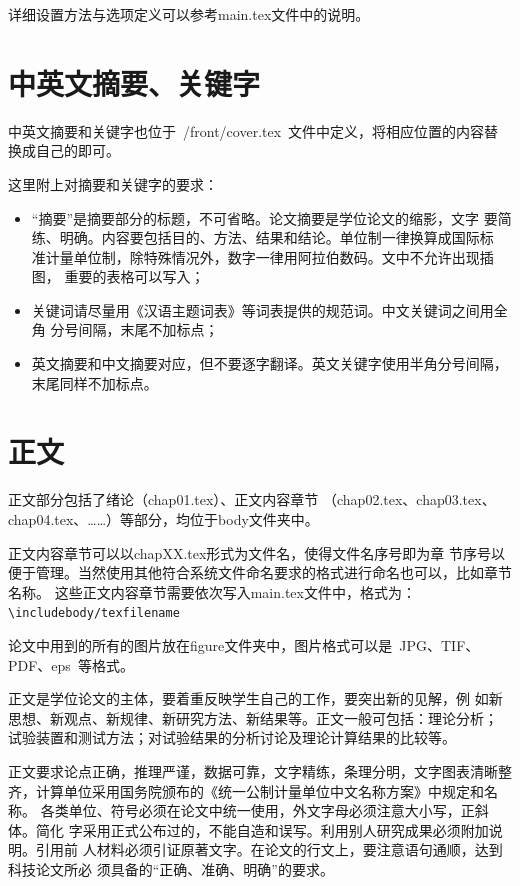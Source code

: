 详细设置方法与选项定义可以参考main.tex文件中的说明。

\section{中英文摘要、关键字}

中英文摘要和关键字也位于~{/front/cover.tex}~文件中定义，将相应位置的内容替换成自己的即可。

这里附上对摘要和关键字的要求：
\begin{itemize}
  \item “摘要”是摘要部分的标题，不可省略。论文摘要是学位论文的缩影，文字
        要简练、明确。内容要包括目的、方法、结果和结论。单位制一律换算成国际标
        准计量单位制，除特殊情况外，数字一律用阿拉伯数码。文中不允许出现插图，
        重要的表格可以写入；
  \item 关键词请尽量用《汉语主题词表》等词表提供的规范词。中文关键词之间用全角
        分号间隔，末尾不加标点；
  \item 英文摘要和中文摘要对应，但不要逐字翻译。英文关键字使用半角分号间隔，
        末尾同样不加标点。
\end{itemize}

\section{正文}

正文部分包括了绪论（chap01.tex）、正文内容章节
（chap02.tex、chap03.tex、chap04.tex、……）等部分，均位于body文件夹中。

正文内容章节可以以chapXX.tex形式为文件名，使得文件名序号即为章
节序号以便于管理。当然使用其他符合系统文件命名要求的格式进行命名也可以，比如章节名称。
这些正文内容章节需要依次写入main.tex文件中，格式为：
\texttt{\textbackslash include{body/texfilename}}

论文中用到的所有的图片放在figure文件夹中，图片格式可以是~JPG、TIF、PDF、eps~等格式。

正文是学位论文的主体，要着重反映学生自己的工作，要突出新的见解，例
如新思想、新观点、新规律、新研究方法、新结果等。正文一般可包括：理论分析；
试验装置和测试方法；对试验结果的分析讨论及理论计算结果的比较等。

正文要求论点正确，推理严谨，数据可靠，文字精练，条理分明，文字图表清晰整
齐，计算单位采用国务院颁布的《统一公制计量单位中文名称方案》中规定和名称。
各类单位、符号必须在论文中统一使用，外文字母必须注意大小写，正斜体。简化
字采用正式公布过的，不能自造和误写。利用别人研究成果必须附加说明。引用前
人材料必须引证原著文字。在论文的行文上，要注意语句通顺，达到科技论文所必
须具备的“正确、准确、明确”的要求。

